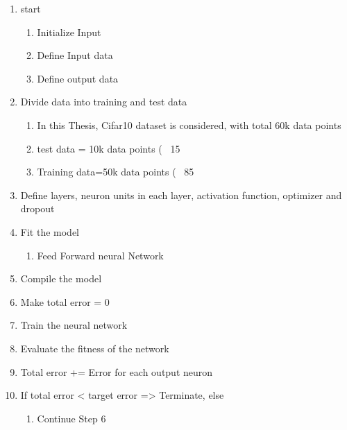 \begin{enumerate}
	\item start
	\begin{enumerate}
		\item Initialize Input
		\item Define Input data
		\item Define output data
	\end{enumerate}
	\item Divide data into training and test data
	\begin{enumerate}
		\item In this Thesis, Cifar10 dataset is considered, with total 60k data points
		\item test data = 10k data points (~ 15%
		\item Training data=50k data points (~ 85%
	\end{enumerate}
	\item Define layers, neuron units in each layer, activation function, optimizer and dropout
	\item Fit the model
	\begin{enumerate}
		\item Feed Forward neural Network
	\end{enumerate}
	\item Compile the model
	\item Make total error = 0
	\item Train the neural network
	\item Evaluate the fitness of the network
	\item Total error += Error for each output neuron
	\item If total error < target error => Terminate, else
	\begin{enumerate}
		\item Continue Step 6
	\end{enumerate}	
\end{enumerate}


